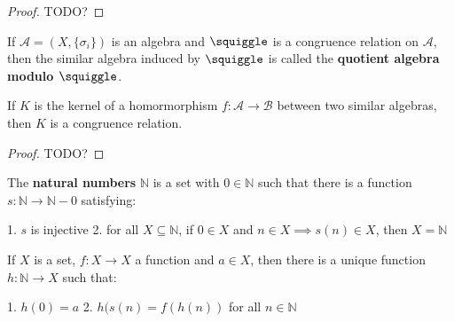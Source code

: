 \begin{proof}
TODO?

\end{proof}


\begin{definition}
\label{def-quotient-algebra}

If $\mathcal{A} = (X, \{\sigma_i\})$ is an algebra and $\squiggle$ is a congruence relation on $\mathcal{A}$, then the similar algebra induced by $\squiggle$ is called the \textbf{quotient algebra modulo $\squiggle$}.

\end{definition}


\begin{proposition}
\label{prop-kernel-is-congrel}

If $K$ is the kernel of a homormorphism $f: \mathcal{A} \rightarrow \mathcal{B}$ between two similar algebras, then $K$ is a congruence relation.

\end{proposition}

\begin{proof}
TODO?

\end{proof}

\begin{definition}
\label{def-natural-numbers}
The \textbf{natural numbers} $\mathbb{N}$ is a set with $0 \in \mathbb{N}$ such that there is a function $s: \mathbb{N} \rightarrow \mathbb{N} - 0$ satisfying:

1. $s$ is injective
2. for all $X \subseteq \mathbb{N}$, if $0 \in X$ and $n \in X \implies s(n) \in X$, then $X = \mathbb{N}$
\end{definition}


\begin{theorem}
\label{theorem-recursion-natural-numbers}

If $X$ is a set, $f: X \rightarrow X$ a function and $a \in X$, then there is a unique function $h: \mathbb{N} \rightarrow X$ such that:

1. $h(0) = a$
2. $h(s(n) = f(h(n))$ for all $n \in \mathbb{N}$

\end{theorem}


